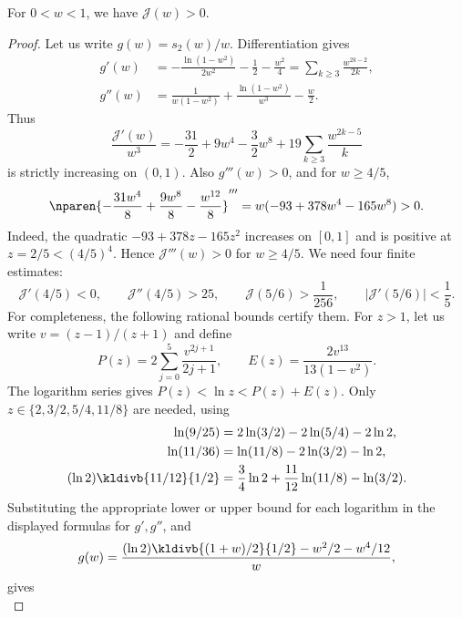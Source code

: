 \begin{lemma}
\label{lem:scalar-fixed-function}
For $0<w<1$, we have $\mathcal J(w)>0$.
\end{lemma}
\begin{proof}
Let us write $g(w)=s_2(w)/w$. Differentiation gives
\begin{align*}
  g'(w)&=-\frac{\ln(1-w^2)}{2w^2}-\frac12-\frac{w^2}{4}
  =\sum_{k\ge3}\frac{w^{2k-2}}{2k},\\
  g''(w)&=\frac{1}{w(1-w^2)}
  +\frac{\ln(1-w^2)}{w^3}-\frac w2.
\end{align*}
Thus
\begin{equation*}
  \frac{\mathcal J'(w)}{w^3}
  =-\frac{31}{2}+9w^4-\frac32w^8
  +19\sum_{k\ge3}\frac{w^{2k-5}}{k}
\end{equation*}
is strictly increasing on $(0,1)$.
Also $g'''(w)>0$, and for $w\ge4/5$,
\begin{equation*}
  \nparen{-\frac{31w^4}{8}+\frac{9w^8}{8}
  -\frac{w^{12}}8}'''
  =w(-93+378w^4-165w^8)>0.
\end{equation*}
Indeed, the quadratic $-93+378z-165z^2$ increases on $[0,1]$
and is positive at $z=2/5<(4/5)^4$.
Hence $\mathcal J'''(w)>0$ for $w\ge4/5$.
We need four finite estimates:
\begin{equation}
  \label{eq:scalar-fixed-checks}
  \mathcal J'(4/5)<0,\qquad
  \mathcal J''(4/5)>25,\qquad
  \mathcal J(5/6)>\frac1{256},\qquad
  |\mathcal J'(5/6)|<\frac15.
\end{equation}
For completeness, the following rational bounds certify them.
For $z>1$, let us write $v=(z-1)/(z+1)$ and define
\begin{equation*}
  P(z)=2\sum_{j=0}^5\frac{v^{2j+1}}{2j+1},\qquad
  E(z)=\frac{2v^{13}}{13(1-v^2)}.
\end{equation*}
The logarithm series gives
$P(z)<\ln z<P(z)+E(z)$.
Only $z\in\{2,3/2,5/4,11/8\}$ are needed, using
\begin{align*}
  \ln(9/25)&=2\ln(3/2)-2\ln(5/4)-2\ln 2,\\
  \ln(11/36)&=\ln(11/8)-2\ln(3/2)-\ln 2,\\
  (\ln 2)\kldivb{11/12}{1/2}&=\frac34\ln 2+\frac{11}{12}\ln(11/8)-\ln(3/2).
\end{align*}
Substituting the appropriate lower or upper bound for each logarithm
in the displayed formulas for $g',g''$, and
\begin{equation*}
  g(w)=\frac{(\ln 2)\kldivb{(1+w)/2}{1/2}-w^2/2-w^4/12}{w},
\end{equation*}
gives
\begin{equation*}

\end{equation*}
\end{proof}
